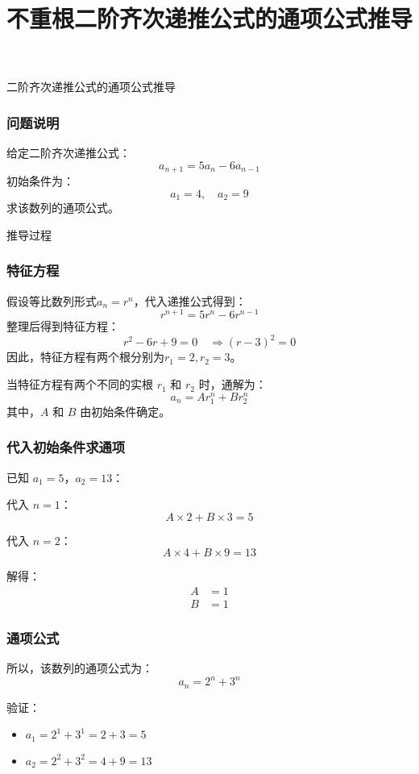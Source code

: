 \documentclass[aspectratio=169]{ctexbeamer} %
\begin{document}
\begin{frame}
\title{不重根二阶齐次递推公式的通项公式推导}
\titlepage
\end{frame}

\begin{frame}{二阶齐次递推公式的通项公式推导}
\frametitle{问题说明}
给定二阶齐次递推公式：
\[
a_{n+1} = 5a_n - 6a_{n-1}
\]
初始条件为：
\[
a_1 = 4, \quad a_2 = 9
\]
求该数列的通项公式。

\end{frame}

\begin{frame}{推导过程}
\frametitle{特征方程}
假设等比数列形式$a_n = r^n$，代入递推公式得到：
\[
r^{n+1} = 5r^n - 6r^{n-1}
\]
整理后得到特征方程：
\[
r^2 - 6r + 9 = 0 \quad \Rightarrow (r - 3)^2 = 0
\]
因此，特征方程有两个根分别为$r_1 = 2, r_2 = 3$。
\end{frame}

\begin{frame}
当特征方程有两个不同的实根 \(r_1\) 和 \(r_2\) 时，通解为：
\begin{equation*}
a_n = A r_1^n + B r_2^n
\end{equation*}
其中，\(A\) 和 \(B\) 由初始条件确定。
\end{frame}

\begin{frame}
\frametitle{代入初始条件求通项}
已知 \(a_1 = 5\)，\(a_2 = 13\)：

代入 \(n = 1\)：
\begin{equation*}
A \times 2 + B \times 3 = 5
\end{equation*}

代入 \(n = 2\)：
\begin{equation*}
A \times 4 + B \times 9 = 13
\end{equation*}

解得：
\begin{align*}
A &= 1 \\
B &= 1
\end{align*}
\end{frame}

\begin{frame}
\frametitle{通项公式}
所以，该数列的通项公式为：
\begin{equation*}
a_n = 2^n + 3^n
\end{equation*}

验证：
\begin{itemize}
\item \(a_1 = 2^1 + 3^1 = 2 + 3 = 5\)
\item \(a_2 = 2^2 + 3^2 = 4 + 9 = 13\)
\end{itemize}
\end{frame}
\end{document}
